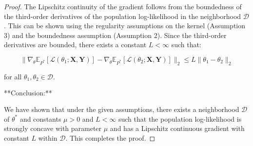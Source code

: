\begin{proof}
The Lipschitz continuity of the gradient follows from the boundedness of the third-order derivatives of the population log-likelihood in the neighborhood $\mathcal{D}$. This can be shown using the regularity assumptions on the kernel (Assumption 3) and the boundedness assumption (Assumption 2). Since the third-order derivatives are bounded, there exists a constant $L < \infty$ such that:

$$
\| \nabla_\theta \mathbb{E}_{P^*}[\mathcal{L}(\theta_1; \mathbf{X}, \mathbf{Y})] - \nabla_\theta \mathbb{E}_{P^*}[\mathcal{L}(\theta_2; \mathbf{X}, \mathbf{Y})] \|_2 \leq L \| \theta_1 - \theta_2 \|_2
$$

for all $\theta_1, \theta_2 \in \mathcal{D}$.

**Conclusion:**

We have shown that under the given assumptions, there exists a neighborhood $\mathcal{D}$ of $\theta^*$ and constants $\mu > 0$ and $L < \infty$ such that the population log-likelihood is strongly concave with parameter $\mu$ and has a Lipschitz continuous gradient with constant $L$ within $\mathcal{D}$. This completes the proof.
\end{proof}
